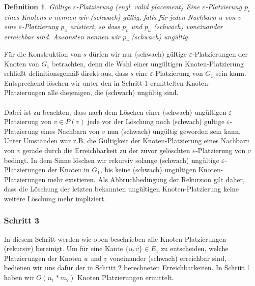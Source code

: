 \documentclass[a4paper, 12pt, twoside]{article}
\theoremstyle{Format1} %
\newtheorem{Def}{Definition}[section]       %
\begin{document}
\begin{Def}
	Gültige $\varepsilon$-Platzierung (engl. valid placement)
	Eine $\varepsilon$-Platzierung $p_v$ eines Knotens $v$ nennen wir (schwach) \textit{gültig}, falls für jeden Nachbarn $u$ von $v$
	eine $\varepsilon$-Platzierung $p_u$ existiert, so dass $p_v$ und $p_u$ (schwach) voneinander erreichbar sind.
	Ansonsten nennen wir $p_v$ (schwach) ungültig.
\end{Def}

Für die Konstruktion von $s$ dürfen wir nur (schwach) gültige $\varepsilon$-Platzierungen der Knoten von $G_1$ betrachten, denn die
Wahl einer ungültigen Knoten-Platzierung schließt definitionsgemäß direkt aus, dass $s$ eine $\varepsilon$-Platzierung von $G_1$ sein kann.
Entsprechend löschen wir unter den in Schritt 1 ermittelten Knoten-Platzierungen alle diejenigen, die (schwach) ungültig sind.
\\
\\
Dabei ist zu beachten, dass nach dem Löschen einer (schwach) ungültigen $\varepsilon$-Platzierung von $v \in P(v)$
jede vor der Löschung noch (schwach) gültige $\varepsilon$-Platzierung eines Nachbarn von $v$ nun (schwach) ungültig geworden sein kann.
Unter Umständen war z.B. die Gültigkeit der Knoten-Platzierung eines Nachbarn von $v$ gerade durch die Erreichbarkeit zu der zuvor gelöschten
$\varepsilon$-Platzierung von $v$ bedingt.
In dem Sinne löschen wir rekursiv solange (schwach) ungültige $\varepsilon$-Platzierungen der Knoten in $G_1$, bis
keine (schwach) ungültigen Knoten-Platzierungen mehr existieren. Als Abbruchbedingung der Rekursion gilt daher, dass die Löschung der letzten bekannten
ungültigen Knoten-Platzierung keine weitere Löschung mehr impliziert.

\subsubsection{Schritt 3} \label{Schritt 3}
In diesem Schritt werden wie oben beschrieben alle Knoten-Platzierungen (rekursiv) bereinigt.
Um für eine Kante $\{u,v\} \in E_1$ zu entscheiden, welche Platzierungen der Knoten $u$ und $v$ voneinander (schwach) erreichbar sind, bedienen wir uns dafür der in
Schritt 2 berechneten Erreichbarkeiten. In Schritt 1 haben wir $O(n_1*m_2)$ Knoten Platzierungen ermittelt.
\end{document}
